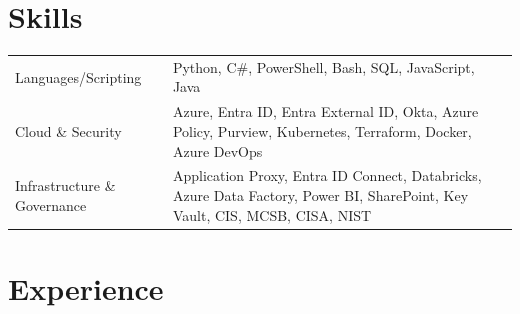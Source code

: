 \documentclass[a4paper,3pt]{article}
\begin{document}


\section{Skills}
\begin{tabularx}{\linewidth}{@{}l X@{}}
    Languages/Scripting & \normalsize{Python, C\#, PowerShell, Bash, SQL, JavaScript, Java}                                                                                                                                         \\
    Cloud \& Security  & \normalsize{Azure, Entra ID, Entra External ID, Okta, Azure Policy, Purview, Kubernetes, Terraform, Docker, Azure DevOps}                            \\
    Infrastructure \& Governance       & \normalsize{Application Proxy, Entra ID Connect, Databricks, Azure Data Factory, Power BI, SharePoint, Key Vault, CIS, MCSB, CISA, NIST} \\
\end{tabularx}


\section{Experience}
\end{document}
